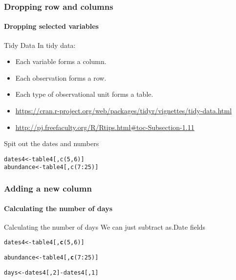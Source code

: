 \documentclass[12pt]{beamer}\usepackage[]{graphicx}\usepackage[]{color}
\makeatletter
\newcommand{\hlnum}[1]{\textcolor[rgb]{0.686,0.059,0.569}{#1}}%
\newcommand{\hlopt}[1]{\textcolor[rgb]{0,0,0}{#1}}%
\newcommand{\hlstd}[1]{\textcolor[rgb]{0.345,0.345,0.345}{#1}}%
\newcommand{\hlkwb}[1]{\textcolor[rgb]{0.69,0.353,0.396}{#1}}%
\newcommand{\hlkwd}[1]{\textcolor[rgb]{0.737,0.353,0.396}{\textbf{#1}}}%
\newenvironment{kframe}{%
 \def\at@end@of@kframe{}%
 \ifinner\ifhmode%
  \def\at@end@of@kframe{\end{minipage}}%
  \begin{minipage}{\columnwidth}%
 \fi\fi%
 \def\FrameCommand##1{\hskip\@totalleftmargin \hskip-\fboxsep
 \colorbox{shadecolor}{##1}\hskip-\fboxsep
     \hskip-\linewidth \hskip-\@totalleftmargin \hskip\columnwidth}%
 \MakeFramed {\advance\hsize-\width
   \@totalleftmargin\z@ \linewidth\hsize
   \@setminipage}}%
 {\par\unskip\endMakeFramed%
 \at@end@of@kframe}
\newenvironment{knitrout}{}{} %
\makeatother
\begin{document}
\begin{frame}[fragile]
  \frametitle{Dropping row and columns}
  \framesubtitle{Dropping selected variables}

\begin{block}{Tidy Data}
In tidy data:
\begin{itemize}
\item Each variable forms a column.
\item Each observation forms a row.
\item Each type of observational unit forms a table.
\item \url{https://cran.r-project.org/web/packages/tidyr/vignettes/tidy-data.html}
\item \url{http://pj.freefaculty.org/R/Rtips.html#toc-Subsection-1.11}
\end{itemize}
\end{block}
 

\begin{block}{Spit out the dates and numbers}
\end{block}
\begin{lstlisting}
dates4<-table4[,c(5,6)]
abundance<-table4[,c(7:25)]
\end{lstlisting}
\end{frame}


\begin{frame}[fragile]
  \frametitle{Adding a new column}
  \framesubtitle{Calculating the number of days}
  \begin{block}{Calculating the number of days}
  We can just subtract as.Date fields
  \end{block}
\begin{knitrout}
\color{fgcolor}\begin{kframe}
\begin{alltt}
\hlstd{dates4}\hlkwb{<-}\hlstd{table4[,}\hlkwd{c}\hlstd{(}\hlnum{5}\hlstd{,}\hlnum{6}\hlstd{)]}
\end{alltt}


{\ttfamily\noindent\bfseries\color{errorcolor}{\#\# Error in eval(expr, envir, enclos): object 'table4' not found}}\begin{alltt}
\hlstd{abundance}\hlkwb{<-}\hlstd{table4[,}\hlkwd{c}\hlstd{(}\hlnum{7}\hlopt{:}\hlnum{25}\hlstd{)]}
\end{alltt}


{\ttfamily\noindent\bfseries\color{errorcolor}{\#\# Error in eval(expr, envir, enclos): object 'table4' not found}}\begin{alltt}
 \hlstd{days}\hlkwb{<-}\hlstd{dates4[,}\hlnum{2}\hlstd{]}\hlopt{-}\hlstd{dates4[,}\hlnum{1}\hlstd{]}
\end{alltt}


{\ttfamily\noindent\bfseries\color{errorcolor}{\#\# Error in eval(expr, envir, enclos): object 'dates4' not found}}\end{kframe}
\end{knitrout}
  
\end{frame}
\end{document}
